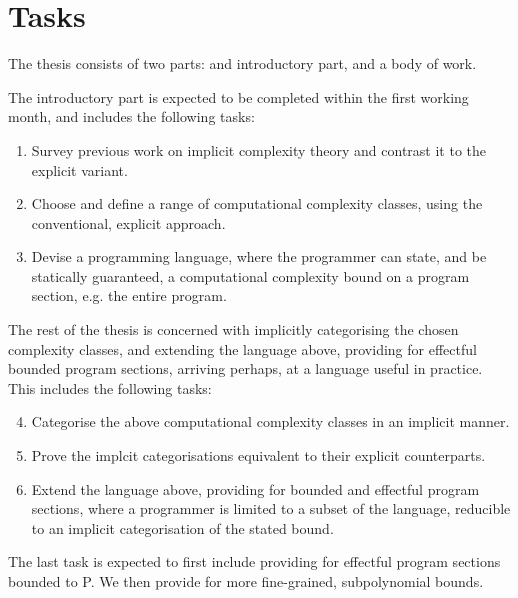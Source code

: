 
\section{Tasks}

The thesis consists of two parts: and introductory part, and a body of work.

The introductory part is expected to be completed within the first working
month, and includes the following tasks:

\begin{enumerate}[(1)]

\item Survey previous work on implicit complexity theory and contrast it to the
explicit variant.

\item Choose and define a range of computational complexity classes, using the
conventional, explicit approach.

\item Devise a programming language, where the programmer can state, and be
statically guaranteed, a computational complexity bound on a program section,
e.g. the entire program.

\end{enumerate}

The rest of the thesis is concerned with implicitly categorising the chosen
complexity classes, and extending the language above, providing for effectful
bounded program sections, arriving perhaps, at a language useful in practice.
This includes the following tasks:

\begin{enumerate}[(1)]

\setcounter{enumi}{3}

\item Categorise the above computational complexity classes in an implicit
manner.

\item Prove the implcit categorisations equivalent to their explicit
counterparts.

\item Extend the language above, providing for bounded and effectful program
sections, where a programmer is limited to a subset of the language, reducible
to an implicit categorisation of the stated bound.

\end{enumerate}

The last task is expected to first include providing for effectful program
sections bounded to P. We then provide for more fine-grained, subpolynomial
bounds.
